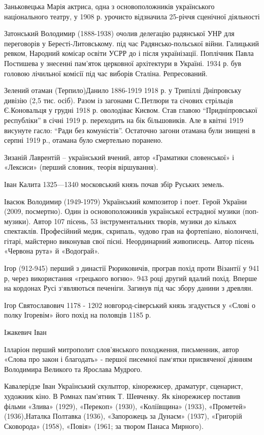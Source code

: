 Заньковецька Марія актриса, одна з основоположників українського національного театру, у 1908 р. урочисто відзначила 25-річчя сценічної діяльності 

Затонський Володимир (1888-1938) очолив делегацію радянської УНР для переговорів у Бересті-Литовському. під час Радянсько-польської війни. Галицький ревком,  Народний комісар освіти УСРР  до і після українізації. Поплічник Павла Постишева у знесенні пам'яток церковної архітектури в Україні. 1934 р. був головою лічильної комісії під час виборів Сталіна. Репресований.

Зелений отаман (Терпило)Данило   1886-1919 1918 р. у Трипіллі Дніпровську дивізію (2,5 тис. осіб). Разом із загонами С.Петлюри та січових стрільців Є.Коновальця у грудні 1918 р. оволодіває Києвом. Став главою “Придніпровської республіки” в січні 1919 р. переходить на бік більшовиків. Але в квітні 1919 висунуте гасло: “Ради без комуністів”. Остаточно загони отамана були знищені в серпні 1919 р., отамана було смертельно поранено. 

Зизаній  Лаврентій – український вчений, автор «Граматики словенської» і «Лексиси» (перший словник, теорія віршування).

Іван Калита 1325—1340 московський князь почав збір Руських земель.

Івасюк Володимир (1949-1979) Український композитор і поет. Герой України (2009, посмертно). Один із основоположників української естрадної музики (поп-музики). Автор 107 пісень, 53 інструментальних творів, музики до кількох спектаклів. Професійний медик, скрипаль, чудово грав на фортепіано, віолончелі, гітарі, майстерно виконував свої пісні. Неординарний живописець. Автор пісень «Червона рута» й «Водограй».

Ігор (912-945) перший з династії Рюриковичів, програв похід проти Візантії у 941 р, через використання «грецького вогню». 943 році другий вдалий похід. Вперше на кордонах Русі з‘являються печеніги. Загинув під час збору данини з древлян.

Ігор Святославович 1178 - 1202 новгород-сіверський князь згадується у «Слові о полку Ігоревім» його похід на половців 1185 р.

Іжакевич Іван 

Ілларіон перший митрополит слов'янського походження, письменник, автор «Слова про закон і благодать» - першої писемної пам‘ятки присвяченої діянням Володимира Великого та Ярослава Мудрого.

Кавалерідзе Іван Український скульптор, кінорежисер, драматург, сценарист, художник кіно. В Ромнах пам’ятник Т. Шевченку. Як кінорежисер поставив фільми «Злива» (1929), «Перекоп» (1930), «Коліївщина» (1933), «Прометей» (1936),Наталка Полтавка (1936), «Запорожець за Дунаєм» (1937), «Григорій Сковорода» (1958), «Повія» (1961; за твором Панаса Мирного). 

